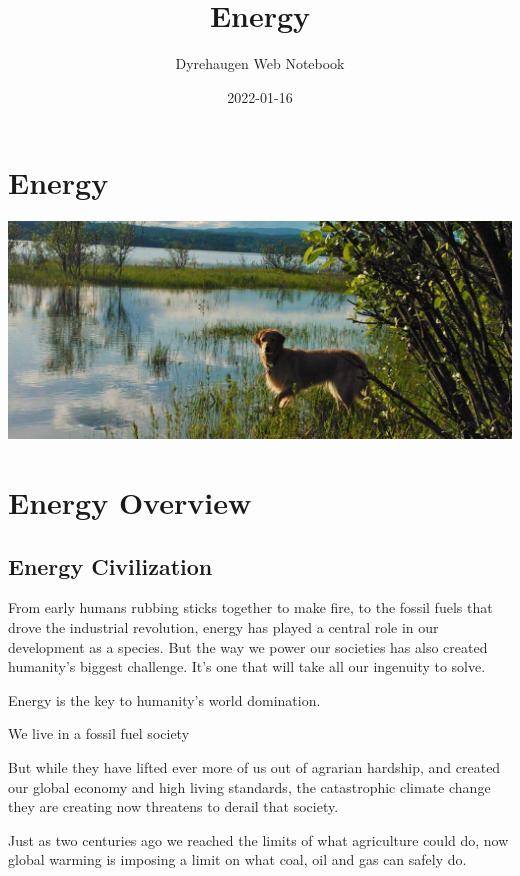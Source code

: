 \documentclass[
]{book}
\title{Energy}
\author{Dyrehaugen Web Notebook}
\date{2022-01-16}
\begin{document}
\maketitle

{
\setcounter{tocdepth}{1}
\tableofcontents
}
\hypertarget{energy}{%
\chapter{Energy}\label{energy}}

\includegraphics{fig/zelda.jpg}

\hypertarget{energy-overview}{%
\chapter{Energy Overview}\label{energy-overview}}

\hypertarget{energy-civilization}{%
\section{Energy Civilization}\label{energy-civilization}}

From early humans rubbing sticks together to make fire, to the fossil fuels that drove the industrial revolution, energy has played a central role in our development as a species. But the way we power our societies has also created humanity's biggest challenge. It's one that will take all our ingenuity to solve.

Energy is the key to humanity's world domination.

We live in a fossil fuel society

But while they have lifted ever more of us out of agrarian hardship, and created our global economy and high living standards, the catastrophic climate change they are creating now threatens to derail that society.

Just as two centuries ago we reached the limits of what agriculture could do, now global warming is imposing a limit on what coal, oil and gas can safely do.
\end{document}
